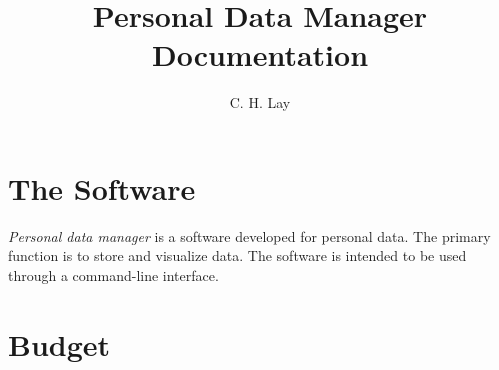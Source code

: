 \documentclass{article}
\title{Personal Data Manager\\ \Large{Documentation}}
\author{C. H. Lay}
\begin{document}
\maketitle
\tableofcontents

\section{The Software}
\emph{Personal data manager} is a software developed for personal data. The primary function is to store and visualize data. The software is intended to be used through a command-line interface.

\section{Budget}
\end{document}
